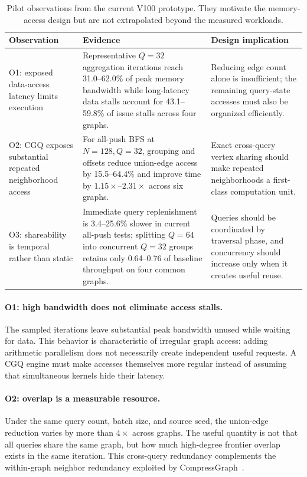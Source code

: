 \begin{table}[t]
  \centering
  \caption{Pilot observations from the current V100 prototype.  They motivate the memory-access design but are not extrapolated beyond the measured workloads.}
  \label{tab:pilot-observations}
  \small
  \begin{tabular}{p{}p{}p{}}
    \toprule
    Observation & Evidence & Design implication \\
    \midrule
    O1: exposed data-access latency limits execution & Representative $Q=32$ aggregation iterations reach 31.0--62.0\% of peak memory bandwidth while long-latency data stalls account for 43.1--59.8\% of issue stalls across four graphs. & Reducing edge count alone is insufficient; the remaining query-state accesses must also be organized efficiently. \\
    O2: CGQ exposes substantial repeated neighborhood access & For all-push BFS at $N=128,Q=32$, grouping and offsets reduce union-edge access by 15.5--64.4\% and improve time by $1.15\times$--$2.31\times$ across six graphs. & Exact cross-query vertex sharing should make repeated neighborhoods a first-class computation unit. \\
    O3: shareability is temporal rather than static & Immediate query replenishment is 3.4--25.6\% slower in current all-push tests; splitting $Q=64$ into concurrent $Q=32$ groups retains only 0.64--0.76 of baseline throughput on four common graphs. & Queries should be coordinated by traversal phase, and concurrency should increase only when it creates useful reuse. \\
    \bottomrule
  \end{tabular}
\end{table}

\paragraph{O1: high bandwidth does not eliminate access stalls.}
The sampled iterations leave substantial peak bandwidth unused while waiting for data.  This behavior is characteristic of irregular graph access: adding arithmetic parallelism does not necessarily create independent useful requests.  A CGQ engine must make accesses themselves more regular instead of assuming that simultaneous kernels hide their latency.

\paragraph{O2: overlap is a measurable resource.}
Under the same query count, batch size, and source seed, the union-edge reduction varies by more than $4\times$ across graphs.  The useful quantity is not that all queries share the same graph, but how much high-degree frontier overlap exists in the same iteration.  This cross-query redundancy complements the within-graph neighbor redundancy exploited by CompressGraph~\cite{chen_compressgraph_2023}.

